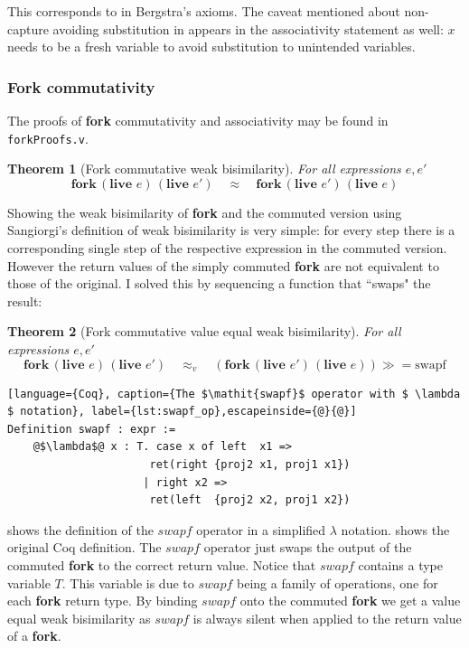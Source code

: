 \documentclass[12pt,twoside,notitlepage]{report}
\theoremstyle{plain}%
\newtheorem{thm}{Theorem}[section]
\theoremstyle{definition}
\theoremstyle{remark}
\begin{document}
This corresponds to  in Bergstra's axioms. The caveat mentioned about non-capture avoiding substitution in  appears in the associativity statement as well: $ x $ needs to be a fresh variable to avoid substitution to unintended variables.

\subsubsection{Fork commutativity}
The proofs of \textbf{fork} commutativity and associativity may be found in \verb|forkProofs.v|.

\begin{thm}[Fork commutative weak bisimilarity]
For all expressions $ e, e'$
\[  \textbf{fork}\,(\textbf{live }e)\,(\textbf{live }e')\quad \approx \quad \textbf{fork}\,(\textbf{live }e')\,(\textbf{live }e) \]
\end{thm}

Showing the weak bisimilarity of \textbf{fork} and the commuted version using Sangiorgi's definition of weak bisimilarity is very simple: for every step there is a corresponding single step of the respective expression in the commuted version. However the return values of the simply commuted \textbf{fork} are not equivalent to those of the original. I solved this by sequencing a function that ``swaps" the result:

\begin{thm}[Fork commutative value equal weak bisimilarity]
For all expressions $ e, e'$
\[  \textbf{fork}\,(\textbf{live }e)\,(\textbf{live }e')\quad \approx_v \quad (\textbf{fork}\,(\textbf{live }e')\,(\textbf{live }e))\gg=\text{swapf} \]
\end{thm}

\begin{lstlisting}[language={Coq}, caption={The $\mathit{swapf}$ operator with $ \lambda $ notation}, label={lst:swapf_op},escapeinside={@}{@}]
Definition swapf : expr :=
    @$\lambda$@ x : T. case x of left  x1 => 
                      ret(right {proj2 x1, proj1 x1}) 
                     | right x2 =>
                      ret(left  {proj2 x2, proj1 x2}) 
\end{lstlisting}
 shows the definition of the $\mathit{swapf}$ operator in a simplified $ \lambda $ notation.  shows the original Coq definition. The $ \mathit{swapf} $ operator just swaps the output of the commuted \textbf{fork} to the correct return value. Notice that $ \mathit{swapf} $ contains a type variable $ T $. This variable is due to $ \mathit{swapf} $ being a family of operations, one for each \textbf{fork} return type. By binding $\mathit{swapf}$ onto the commuted \textbf{fork} we get a value equal weak bisimilarity as $\mathit{swapf}$ is always silent when applied to the return value of a \textbf{fork}.
\end{document}
